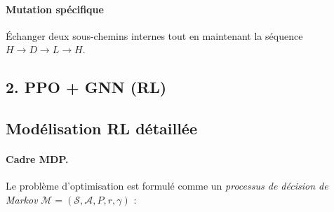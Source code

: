 \documentclass[11pt,a4paper]{article}
\begin{document}
\paragraph{Mutation spécifique}  
Échanger deux sous-chemins internes tout en maintenant la séquence \(H\to D\to L\to H\).

\subsection{2. PPO + GNN (RL)}


\subsection{Modélisation RL détaillée}
\label{sec:mdp}

\paragraph{Cadre MDP.}
Le problème d'optimisation est formulé comme un \emph{processus de décision de Markov} 
$\mathcal{M}=(\mathcal{S},\mathcal{A},P,r,\gamma)$ :
\end{document}
